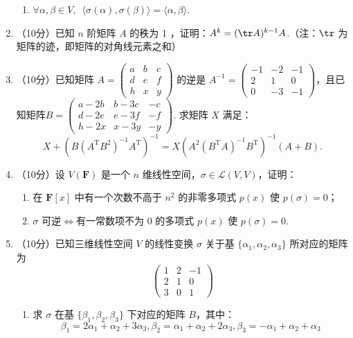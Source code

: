\begin{enumerate}
\begin{enumerate}
        \item $\forall \alpha,\beta \in V,\enspace \langle\sigma (\alpha),\sigma (\beta)\rangle=\langle\alpha,\beta\rangle$.
    \end{enumerate}

    \item （10分）已知 $n$ 阶矩阵 $A$ 的秩为 1 ，证明：$A^k=(\tr A)^{k-1}A$.（注：$\tr$ 为矩阵的迹，即矩阵的对角线元素之和）

    \item （10分）已知矩阵 $A=\begin{pmatrix}a & b & c \\ d & e & f \\ h & x & y\end{pmatrix}$ 的逆是 $A^{-1}=\begin{pmatrix}-1 & -2 & -1 \\ 2 & 1 & 0 \\ 0 & -3 & -1\end{pmatrix}$，且已知矩阵$B=\begin{pmatrix}a-2b & b-3c & -c \\ d-2e & e-3f & -f \\ h-2x & x-3y & -y\end{pmatrix}$. 求矩阵 $X$ 满足：
    \[X+(B(A^\mathrm{T}B^2)^{-1}A^\mathrm{T})^{-1}=X(A^2(B^\mathrm{T}A)^{-1}B^\mathrm{T})^{-1}(A+B).\]

    \item （10分）设 $V(\mathbf{F})$ 是一个 $n$ 维线性空间，$\sigma \in \mathcal{L}(V,V)$，证明：
    \begin{enumerate}
        \item 在 $\mathbf{F}[x]$ 中有一个次数不高于 $n^2$ 的非零多项式 $p(x)$ 使 $p(\sigma)=0$；

        \item $\sigma$ 可逆$\iff$有一常数项不为 0 的多项式 $p(x)$ 使 $p(\sigma)=0$.
    \end{enumerate}

    \item （10分）已知三维线性空间 $V$ 的线性变换 $\sigma$ 关于基 $\{\alpha_1,\alpha_2,\alpha_3\}$ 所对应的矩阵为
    \[\begin{pmatrix}1 & 2 & -1 \\ 2 & 1 & 0 \\ 3 & 0 & 1\end{pmatrix}\]
    \begin{enumerate}
        \item 求 $\sigma$ 在基 $\{\beta_1, \beta_2, \beta_3\}$ 下对应的矩阵 $B$，其中：
        \[\beta_1=2\alpha_1+\alpha_2+3\alpha_3, \beta_2=\alpha_1+\alpha_2+2\alpha_3, \beta_3=-\alpha_1+\alpha_2+\alpha_3\]


\end{enumerate}
\end{enumerate}
